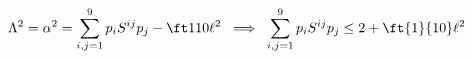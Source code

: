 \begin{equation}\label{La2}
\Lambda^2 = \alpha^2 = \sum_{i,j=1}^9 p_i S^{ij} p_j - \ft1{10}\ell^2 \;\;
\Longrightarrow  \;\; \sum_{i,j=1}^9 p_i S^{ij} p_j \leq 2 + \ft{1}{10}\ell^2
\end{equation}

